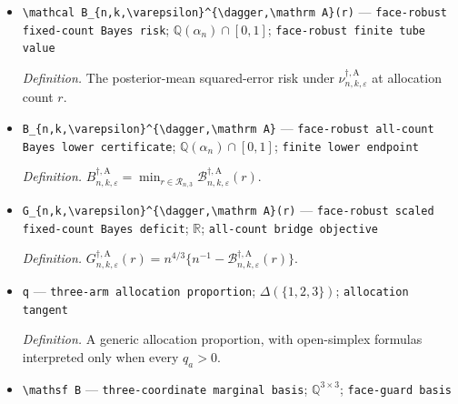 \documentclass{article}
\begin{document}
\begin{itemize}
  \par\smallskip\noindent\emph{Definition.} The permutation-invariant three-coordinate finite prior in \(\mathrm{def:explicit\text{-}three\text{-}arm\text{-}airy\text{-}tube}\).
  \item \texttt{\textbackslash{}\allowbreak{}mathcal B\_\allowbreak{}\{n,\allowbreak{}k,\allowbreak{}\textbackslash{}\allowbreak{}varepsilon\}\allowbreak{}\textasciicircum{}\{\textbackslash{}\allowbreak{}dagger,\allowbreak{}\textbackslash{}\allowbreak{}mathrm A\}\allowbreak{}(r)} --- \texttt{face-\allowbreak{}robust fixed-\allowbreak{}count Bayes risk}; \(\mathbb Q(\alpha_n)\cap[0,1]\); \texttt{face-\allowbreak{}robust finite tube value}
  \par\smallskip\noindent\emph{Definition.} The posterior-mean squared-error risk under \(\nu_{n,k,\varepsilon}^{\dagger,\mathrm A}\) at allocation count \(r\).
  \item \texttt{B\_\allowbreak{}\{n,\allowbreak{}k,\allowbreak{}\textbackslash{}\allowbreak{}varepsilon\}\allowbreak{}\textasciicircum{}\{\textbackslash{}\allowbreak{}dagger,\allowbreak{}\textbackslash{}\allowbreak{}mathrm A\}\allowbreak{}} --- \texttt{face-\allowbreak{}robust all-\allowbreak{}count Bayes lower certificate}; \(\mathbb Q(\alpha_n)\cap[0,1]\); \texttt{finite lower endpoint}
  \par\smallskip\noindent\emph{Definition.} \(B_{n,k,\varepsilon}^{\dagger,\mathrm A}=\min_{r\in\mathcal R_{n,3}}\mathcal B_{n,k,\varepsilon}^{\dagger,\mathrm A}(r)\).
  \item \texttt{G\_\allowbreak{}\{n,\allowbreak{}k,\allowbreak{}\textbackslash{}\allowbreak{}varepsilon\}\allowbreak{}\textasciicircum{}\{\textbackslash{}\allowbreak{}dagger,\allowbreak{}\textbackslash{}\allowbreak{}mathrm A\}\allowbreak{}(r)} --- \texttt{face-\allowbreak{}robust scaled fixed-\allowbreak{}count Bayes deficit}; \(\mathbb R\); \texttt{all-\allowbreak{}count bridge objective}
  \par\smallskip\noindent\emph{Definition.} \(G_{n,k,\varepsilon}^{\dagger,\mathrm A}(r)=n^{4/3}\{n^{-1}-\mathcal B_{n,k,\varepsilon}^{\dagger,\mathrm A}(r)\}\).
  \item \texttt{q} --- \texttt{three-\allowbreak{}arm allocation proportion}; \(\Delta(\{1,2,3\})\); \texttt{allocation tangent}
  \par\smallskip\noindent\emph{Definition.} A generic allocation proportion, with open-simplex formulas interpreted only when every \(q_a>0\).
  \item \texttt{\textbackslash{}\allowbreak{}mathsf B} --- \texttt{three-\allowbreak{}coordinate marginal basis}; \(\mathbb Q^{3\times3}\); \texttt{face-\allowbreak{}guard basis}

\end{itemize}
\end{document}
